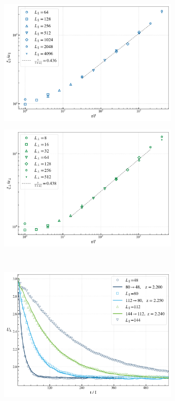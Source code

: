 \begin{figure}
	\begin{subfigure}{0.475\textwidth}
		\centering
		\includegraphics[width=0.96\linewidth]{graphics/tau-xi-parallel-small-h3.png}
	\end{subfigure}
	\begin{subfigure}{0.475\textwidth}
		\centering		
		\includegraphics[width=0.96\linewidth]{graphics/tau-xi-perp-small-h3.png}
	\end{subfigure} \\ \par\bigskip
	\begin{subfigure}{0.475\textwidth}
	\centering
	\includegraphics[width=0.96\linewidth]{graphics/z-h-0.5-3.png}

\end{subfigure}
\end{figure}
